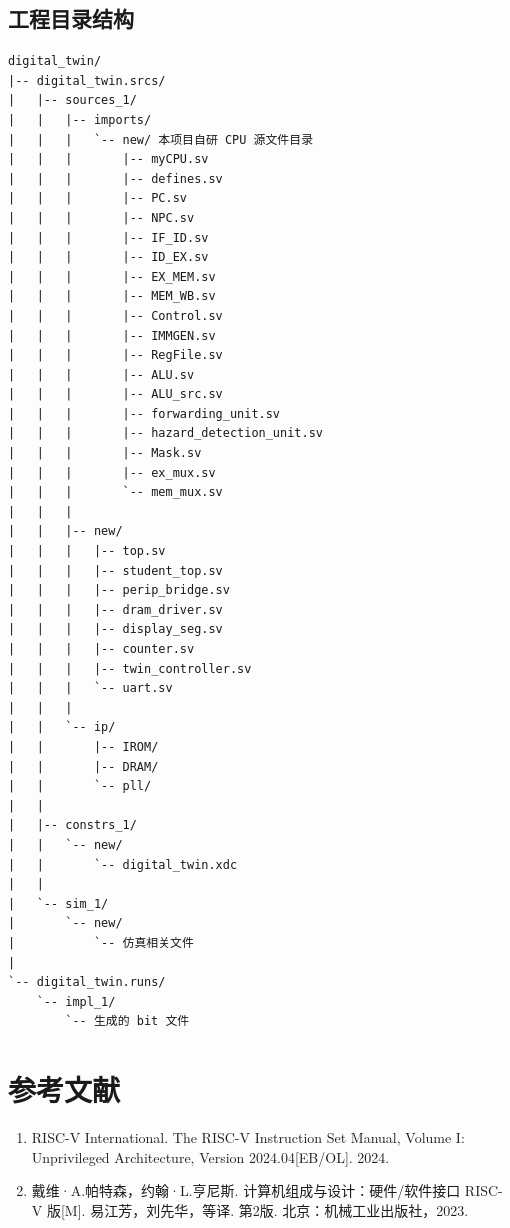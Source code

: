 \documentclass[12pt,a4paper]{ctexart}
\begin{document}
\subsection{工程目录结构}

\begin{verbatim}
digital_twin/
|-- digital_twin.srcs/
|   |-- sources_1/
|   |   |-- imports/
|   |   |   `-- new/ 本项目自研 CPU 源文件目录
|   |   |       |-- myCPU.sv
|   |   |       |-- defines.sv
|   |   |       |-- PC.sv
|   |   |       |-- NPC.sv
|   |   |       |-- IF_ID.sv
|   |   |       |-- ID_EX.sv
|   |   |       |-- EX_MEM.sv
|   |   |       |-- MEM_WB.sv
|   |   |       |-- Control.sv
|   |   |       |-- IMMGEN.sv
|   |   |       |-- RegFile.sv
|   |   |       |-- ALU.sv
|   |   |       |-- ALU_src.sv
|   |   |       |-- forwarding_unit.sv
|   |   |       |-- hazard_detection_unit.sv
|   |   |       |-- Mask.sv
|   |   |       |-- ex_mux.sv
|   |   |       `-- mem_mux.sv
|   |   |
|   |   |-- new/
|   |   |   |-- top.sv
|   |   |   |-- student_top.sv
|   |   |   |-- perip_bridge.sv
|   |   |   |-- dram_driver.sv
|   |   |   |-- display_seg.sv
|   |   |   |-- counter.sv
|   |   |   |-- twin_controller.sv
|   |   |   `-- uart.sv
|   |   |
|   |   `-- ip/
|   |       |-- IROM/
|   |       |-- DRAM/
|   |       `-- pll/
|   |
|   |-- constrs_1/
|   |   `-- new/
|   |       `-- digital_twin.xdc
|   |
|   `-- sim_1/
|       `-- new/
|           `-- 仿真相关文件
|
`-- digital_twin.runs/
    `-- impl_1/
        `-- 生成的 bit 文件
\end{verbatim}


\clearpage
\section*{参考文献}

\begin{enumerate}
	\item RISC-V International. The RISC-V Instruction Set Manual, Volume I: Unprivileged Architecture, Version 2024.04[EB/OL]. 2024.

	\item 戴维·A.帕特森，约翰·L.亨尼斯. 计算机组成与设计：硬件/软件接口 RISC-V 版[M]. 易江芳，刘先华，等译. 第2版. 北京：机械工业出版社，2023.
\end{enumerate}
\end{document}
